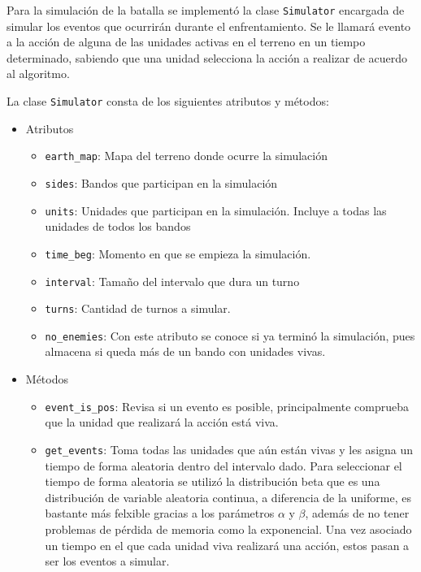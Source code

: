 Para la simulaci\'on de la batalla se implement\'o la clase \verb|Simulator|  encargada de simular los eventos que ocurrir\'an durante el enfrentamiento. Se le llamar\'a evento a la acci\'on de alguna de las unidades activas en el terreno en un tiempo determinado, sabiendo que una unidad selecciona la acci\'on a realizar de acuerdo al algoritmo.

La clase \verb|Simulator| consta de los siguientes atributos y m\'etodos:

\begin{itemize}

\item Atributos
 \begin{itemize}
 \item \verb|earth_map|: Mapa del terreno donde ocurre la simulaci\'on
 
 \item \verb|sides|: Bandos que participan en la simulaci\'on
 
 \item \verb|units|: Unidades que participan en la simulación. Incluye a todas las unidades de todos los bandos
 
 \item \verb|time_beg|: Momento en que se empieza la simulaci\'on.
 
 \item \verb|interval|: Tama\~no del intervalo que dura un turno
 
 \item \verb|turns|: Cantidad de turnos a simular.
 
 \item \verb|no_enemies|: Con este atributo se conoce si ya terminó la simulaci\'on, pues almacena si queda m\'as de un bando con unidades vivas.
 
 \end{itemize}
 \item M\'etodos
 
 \begin{itemize}
 \item \verb|event_is_pos|: Revisa si un evento es posible, principalmente comprueba que la unidad que realizar\'a la acci\'on est\'a viva.
 
 \item \verb|get_events|: Toma todas las unidades que a\'un est\'an vivas y les asigna un tiempo de forma aleatoria dentro del intervalo dado. Para seleccionar el tiempo de forma aleatoria se utiliz\'o la distribuci\'on beta que es una distribución de variable aleatoria continua, a diferencia de la uniforme, es bastante m\'as felxible gracias a los par\'ametros $ \alpha $ y $ \beta $, adem\'as de no tener problemas de p\'erdida de memoria como la exponencial. Una vez asociado un tiempo en el que cada unidad viva realizar\'a una acci\'on, estos pasan a ser los eventos a simular.
 

\end{itemize}
\end{itemize}
